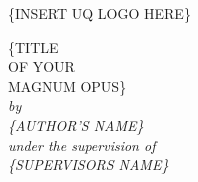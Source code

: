 \documentclass[12pt,openany,a4paper]{book}
\renewcommand{\baselinestretch}{1.2}	%
\begin{document}
\frontmatter

\begin{titlepage}
\renewcommand{\baselinestretch}{1.0}
\begin{center}
\vspace*{35mm}
\Huge\bf
		
        \{INSERT UQ LOGO HERE\} \\ 
        \vspace*{25mm}
        
        \{TITLE\\
		OF YOUR\\
		MAGNUM OPUS\}\\
\vspace{20mm}
\large\sl
		by\\
		\{AUTHOR'S NAME\}
		\medskip\\

\large\sl
		under the supervision of\\
		\{SUPERVISORS NAME\}
		\medskip\\
\rm
	
\end{center}
\end{titlepage}
\end{document}
